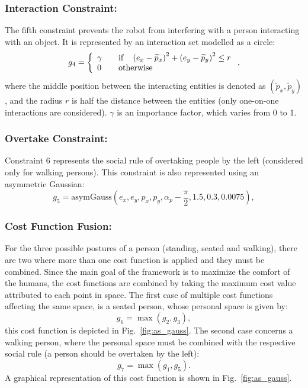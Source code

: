 \documentclass[5p,time]{elsarticle}
\begin{document}
\subsubsection{Interaction Constraint:}\label{sec:iteraction_constraint}
The fifth constraint prevents the robot from interfering with a person interacting with an object. It is represented by an interaction set modelled as a circle:
\begin{equation}
g_4 = \left\{ \begin{array}{l l} \gamma & \quad \text{if} \quad \left(e_x-\widetilde{p}_x\right)^2 + \left(e_y-\widetilde{p}_y\right)^2 \leq r\\ 0 & \quad \text{otherwise} \end{array} \right. ,
\label{eq:f4}
\end{equation}
where the middle position between the interacting entities is denoted as $\left(\widetilde{p}_x,\widetilde{p}_y\right)$, and the radius $r$ is half the distance between the entities (only one-on-one interactions are considered). $\gamma$ is an importance factor, which varies from 0 to 1.

\subsubsection{Overtake Constraint:}\label{sec:overtake_constraint}
Constraint 6 represents the social rule of overtaking people by the left (considered only for walking persons). This constraint is also represented using an asymmetric Gaussian:
\begin{equation}
g_5 = \text{asymGauss}(e_x,e_y,p_x,p_y,\alpha_p-\frac{\pi}{2},1.5,0.3,0.0075),
\label{eq:f5}
\end{equation}

\subsubsection{Cost Function Fusion:}
For the three possible postures of a person (standing, seated and walking), there are two where more than one cost function is applied and they must be combined. Since the main goal of the framework is to maximize the comfort of the humans, the cost functions are combined by taking the maximum cost value attributed to each point in space. The first case of multiple cost functions affecting the same space, is a seated person, whose personal space is given by:
\begin{equation}
g_6 = \max\left(g_2, g_3\right),
\end{equation}
this cost function is depicted in Fig.~\ref{fig:as_gauss}. The second case concerns a walking person, where the personal space must be combined with the respective social rule (a person should be overtaken by the left):
\begin{equation}
g_7 = \max\left(g_1, g_5\right).
\end{equation}
A graphical representation of this cost function is shown in Fig.~\ref{fig:as_gauss}.
\end{document}
